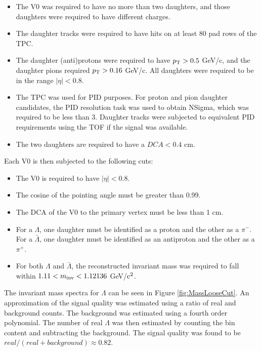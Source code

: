 \begin{itemize}
\item The V0 was required to have no more than two daughters, and those daughters were required to have different charges.
\item The daughter tracks were required to have hits on at least 80 pad rows of the TPC.
\item The daughter (anti)protons were required to have $p_{\rm T} > 0.5$ GeV/c, and the daughter pions required $p_{\rm T} > 0.16$ GeV/c.  All daughters were required to be in the range $|\eta| < 0.8$.
\item The TPC was used for PID purposes.  For proton and pion daughter candidates, the PID resolution task was used to obtain NSigma, which was required to be less than 3. Daughter tracks were subjected to equivalent PID requirements using the TOF if the signal was available.
\item The two daughters are required to have a $DCA < 0.4$ cm.
\end{itemize}

Each V0 is then subjected to the following cuts:
\begin{itemize}
\item The V0 is required to have $|\eta| < 0.8$.
\item The cosine of the pointing angle must be greater than 0.99.
\item The DCA of the V0 to the primary vertex must be less than 1 cm.
\item For a $\Lambda$, one daughter must be identified as a proton and the other as a $\pi^-$.  For a $\bar{\Lambda}$, one daughter must be identified as an antiproton and the other as a $\pi^+$.
\item For both $\Lambda$ and $\bar{\Lambda}$, the reconstructed invariant mass was required to fall within $ 1.11 < m_{\rm inv} < 1.12136$ GeV/${\rm c^2}$.
\end{itemize}

The invariant mass spectra for $\Lambda$ can be seen in Figure \ref{fig:MassLooseCut}. An approximation of the signal quality was estimated using a ratio of real and background counts.  The background was estimated using a fourth order polynomial.  The number of real $\Lambda$ was then estimated by counting the bin content and subtracting the background. The signal quality was found to be $real/(real + background) \approx 0.82$.

